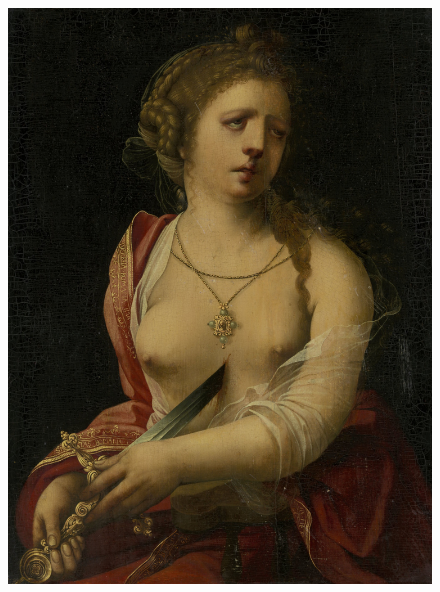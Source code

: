 \cleartoleftpage{}
\begin{figure}[p]
  \begingroup
  \centering
  \includegraphics[keepaspectratio,width=\textwidth]{figures/suicide-of-lucretia-small.jpg}
  \label{fig:suicideoflucretia}
\end{figure}
\clearpage{}
\thispagestyle{titleontop}
